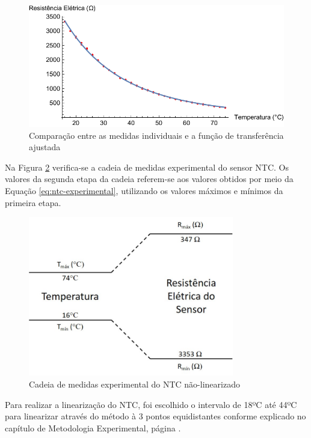 \documentclass[a4paper]{instrumentacao}
\begin{document}
\begin{figure}[H]
\center
\includegraphics[width=\textwidth]{NTC-FitPlot.pdf}
\caption{Comparação entre as medidas individuais e a função de transferência ajustada}
\label{fig:ntc-experimental-comparacao}
\end{figure}

Na Figura \ref{fig:ntc-cadeia-medidas} verifica-se a cadeia de medidas experimental do sensor NTC. Os valores da segunda etapa da cadeia referem-se aos valores obtidos por meio da Equação \ref{eq:ntc-experimental}, utilizando os valores máximos e mínimos da primeira etapa.

\begin{figure}[H]
\center
\includegraphics[width=0.8\textwidth]{cadeia_medidas_ntc.jpg}
\caption{Cadeia de medidas experimental do NTC não-linearizado}
\label{fig:ntc-cadeia-medidas}
\end{figure}

Para realizar a linearização do NTC, foi escolhido o intervalo de 18ºC até 44ºC para linearizar através do método à 3 pontos equidistantes conforme explicado no capítulo de Metodologia Experimental, página \pageref{sec:ntc-linearizacao}.
\end{document}
